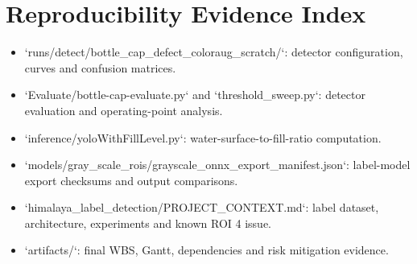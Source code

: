 \documentclass[12pt,a4paper]{report}
\begin{document}
\chapter{Reproducibility Evidence Index}
\begin{itemize}
\item `runs/detect/bottle_cap_defect_coloraug_scratch/`: detector configuration, curves and confusion matrices.
\item `Evaluate/bottle-cap-evaluate.py` and `threshold_sweep.py`: detector evaluation and operating-point analysis.
\item `inference/yoloWithFillLevel.py`: water-surface-to-fill-ratio computation.
\item `models/gray_scale_rois/grayscale_onnx_export_manifest.json`: label-model export checksums and output comparisons.
\item `himalaya_label_detection/PROJECT_CONTEXT.md`: label dataset, architecture, experiments and known ROI 4 issue.
\item `artifacts/`: final WBS, Gantt, dependencies and risk mitigation evidence.
\end{itemize}
\end{document}
